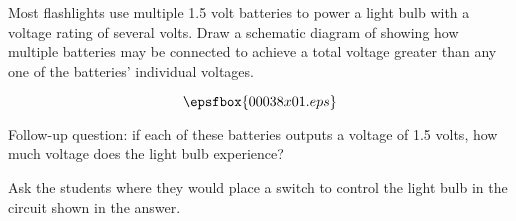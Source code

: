 

Most flashlights use multiple 1.5 volt batteries to power a light bulb with a voltage rating of several volts.  Draw a schematic diagram of showing how multiple batteries may be connected to achieve a total voltage greater than any one of the batteries' individual voltages.







$$\epsfbox{00038x01.eps}$$

\vskip 10pt

Follow-up question: if each of these batteries outputs a voltage of 1.5 volts, how much voltage does the light bulb experience?







Ask the students where they would place a switch to control the light bulb in the circuit shown in the answer.




